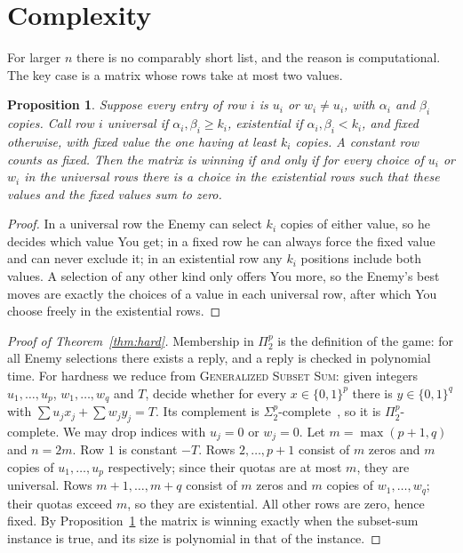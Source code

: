 \documentclass[11pt]{article}
\newtheorem{proposition}[theorem]{Proposition}
\theoremstyle{definition}
\theoremstyle{remark}
\begin{document}
\section{Complexity}

For larger $n$ there is no comparably short list, and the reason is computational. The key case is a matrix whose rows take at most two values.

\begin{proposition}\label{prop:two}
Suppose every entry of row $i$ is $u_i$ or $w_i\ne u_i$, with $\alpha_i$ and $\beta_i$ copies. Call row $i$ \emph{universal} if $\alpha_i,\beta_i\ge k_i$, \emph{existential} if $\alpha_i,\beta_i<k_i$, and \emph{fixed} otherwise, with fixed value the one having at least $k_i$ copies. A constant row counts as fixed. Then the matrix is winning if and only if for every choice of $u_i$ or $w_i$ in the universal rows there is a choice in the existential rows such that these values and the fixed values sum to zero.
\end{proposition}

\begin{proof}
In a universal row the Enemy can select $k_i$ copies of either value, so he decides which value You get; in a fixed row he can always force the fixed value and can never exclude it; in an existential row any $k_i$ positions include both values. A selection of any other kind only offers You more, so the Enemy's best moves are exactly the choices of a value in each universal row, after which You choose freely in the existential rows.
\end{proof}

\begin{proof}[Proof of Theorem~\ref{thm:hard}]
Membership in $\Pi_2^p$ is the definition of the game: for all Enemy selections there exists a reply, and a reply is checked in polynomial time. For hardness we reduce from \textsc{Generalized Subset Sum}: given integers $u_1,\dots,u_p$, $w_1,\dots,w_q$ and $T$, decide whether for every $x\in\{0,1\}^p$ there is $y\in\{0,1\}^q$ with $\sum u_jx_j+\sum w_jy_j=T$. Its complement is $\Sigma_2^p$-complete~\cite{BKLPR,SU}, so it is $\Pi_2^p$-complete. We may drop indices with $u_j=0$ or $w_j=0$. Let $m=\max(p+1,q)$ and $n=2m$. Row $1$ is constant $-T$. Rows $2,\dots,p+1$ consist of $m$ zeros and $m$ copies of $u_{1},\dots,u_p$ respectively; since their quotas are at most $m$, they are universal. Rows $m+1,\dots,m+q$ consist of $m$ zeros and $m$ copies of $w_1,\dots,w_q$; their quotas exceed $m$, so they are existential. All other rows are zero, hence fixed. By Proposition~\ref{prop:two} the matrix is winning exactly when the subset-sum instance is true, and its size is polynomial in that of the instance.
\end{proof}
\end{document}
